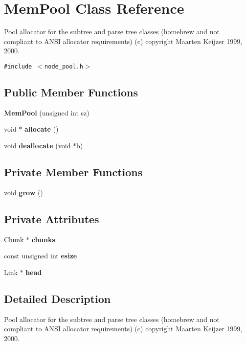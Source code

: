 \section{Mem\-Pool Class Reference}
\label{class_mem_pool}
Pool allocator for the subtree and parse tree classes (homebrew and not compliant to ANSI allocator requirements) (c) copyright Maarten Keijzer 1999, 2000.  


{\tt \#include $<$node\_\-pool.h$>$}

\subsection*{Public Member Functions}
\begin{CompactItemize}
\item 
{\bf Mem\-Pool} (unsigned int sz)\label{class_mem_pool_a0}

\item 
void $\ast$ {\bf allocate} ()\label{class_mem_pool_a2}

\item 
void {\bf deallocate} (void $\ast$b)\label{class_mem_pool_a3}

\end{CompactItemize}
\subsection*{Private Member Functions}
\begin{CompactItemize}
\item 
void {\bf grow} ()\label{class_mem_pool_d0}

\end{CompactItemize}
\subsection*{Private Attributes}
\begin{CompactItemize}
\item 
Chunk $\ast$ {\bf chunks}\label{class_mem_pool_r0}

\item 
const unsigned int {\bf esize}\label{class_mem_pool_r1}

\item 
Link $\ast$ {\bf head}\label{class_mem_pool_r2}

\end{CompactItemize}


\subsection{Detailed Description}
Pool allocator for the subtree and parse tree classes (homebrew and not compliant to ANSI allocator requirements) (c) copyright Maarten Keijzer 1999, 2000. 

